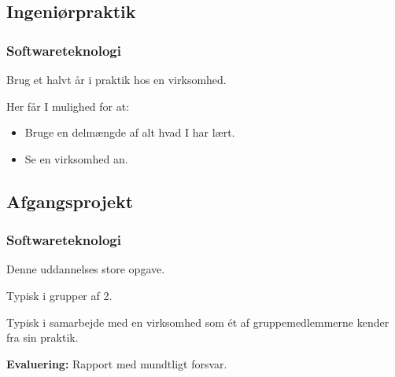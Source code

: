 {\begin{frame}[fragile]
{
  }
\end{frame}

\subsection{Ingeniørpraktik}
\begin{frame}[fragile]
  \frametitle{Softwareteknologi }
  \vspace{3mm}
  Brug et halvt år i praktik hos en virksomhed.
  
  \vspace{5mm}
  Her får I mulighed for at:
  \begin{itemize}
    \item Bruge en delmængde af alt hvad I har lært.
    \item Se en virksomhed an.
  \end{itemize}
\end{frame}

\subsection{Afgangsprojekt}
\begin{frame}[fragile]
  \frametitle{Softwareteknologi }
  \vspace{3mm}
  Denne uddannelses store opgave.
  
  \vspace{5mm}
  Typisk i grupper af 2.
  
  \vspace{5mm}
  Typisk i samarbejde med en virksomhed som ét af gruppemedlemmerne kender fra sin praktik.
  
  \pause
  \vspace{5mm}
  \textbf{Evaluering:} Rapport med mundtligt forsvar.
\end{frame}

}

